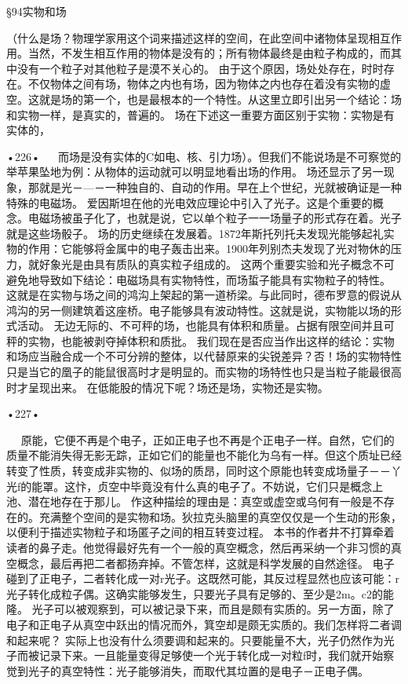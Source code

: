 §94实物和场

（什么是场？物理学家用这个词来描述这样的空间，在此空间中诸物体呈现相互作用。当然，不发生相互作用的物体是没有的；所有物体最终是由粒子构成的，而其中没有一个粒子对其他粒子是漠不关心的。
由于这个原因，场处处存在，时时存在。不仅物体之间有场，物体之内也有场，因为物体之内也存在着没有实物的虚空。这就是场的第一个，也是最根本的一个特性。从这里立即引出另一个结论：场和实物一样，是真实的，普遍的。
场在下述这一重要方面区别于实物：实物是有实体的，

•226•
  
而场是没有实体的C如电、核、引力场）。但我们不能说场是不可察觉的举苹果坠地为例：从物体的运动就可以明显地看出场的作用。
场还显示了另一现象，那就是光－—－一种独自的、自动的作用。早在上个世纪，光就被确证是一种特殊的电磁场。
爱因斯坦在他的光电效应理论中引入了光子。这是个重要的概念。电磁场被虽子化了，也就是说，它以单个粒子一一场量子的形式存在着。光子就是这些场骰子。
场的历史继续在发展着。1872年斯托列托夫发现光能够起礼实物的作用：它能够将金属中的电子轰击出来。1900年列别杰夫发现了光对物休的压力，就好象光是由具有质队的真实粒子组成的。
这两个重要实验和光子概念不可避免地导致如下结论：电磁场具有实物特性，而场蜇子能具有实物粒子的特性。
这就是在实物与场之间的鸿沟上架起的第一道桥梁。与此同时，德布罗意的假说从鸿沟的另一侧建筑着这座桥。电子能够具有波动特性。这就是说，实物能以场的形式活动。
无边无际的、不可秤的场，也能具有体积和质量。占据有限空间并且可秤的实物，也能被剥夺掉体积和质批。
我们现在是否应当作出这样的结论：实物和场应当融合成一个不可分辨的整体，以代替原来的尖锐差异？否！场的实物特性只是当它的凰子的能鼠很高时才是明显的。而实物的场特性也只是当粒子能最很高时才呈现出来。
在低能股的情况下呢？场还是场，实物还是实物。

•227•

  
原能，它便不再是个电子，正如正电子也不再是个正电子一样。自然，它们的质量不能消失得无影无踪，正如它们的能量也不能化为乌有一样。但这个质址已经转变了性质，转变成非实物的、似场的质昂，同时这个原能也转变成场量子－－丫光f的能罩。这忭，贞空中毕竟没有什么真的电子了。不妨说，它们只是概念上池、潜在地存在于那儿。
作这种描绘的理由是：真空或虚空或乌何有一般是不存在的。充满整个空间的是实物和场。狄拉克头脑里的真空仅仅是一个生动的形象，以便利于描述实物粒子和场匿子之间的相互转变过程。
本书的作者井不打算牵着读者的鼻子走。他觉得最好先有一个一般的真空概念，然后再采纳一个非习惯的真空概念，最后再把二者都扬弃掉。不管怎样，这就是科学发展的自然途径。
电子碰到了正电子，二者转化成一对r光子。这既然可能，其反过程显然也应该可能：r光子转化成粒子偶。这确实能够发生，只要光子具有足够的、至少是2m。c2的能隆。
光子可以被观察到，可以被记录下来，而且是颇有实质的。另一方面，除了电子和正电子从真空中跃出的情况而外，箕空却是颇无实质的。我们怎样将二者调和起来呢？
实际上也没有什么须要调和起来的。只要能量不大，光子仍然作为光子而被记录下来。一且能量变得足够使一个光于转化成一对粒f时，我们就开始察觉到光子的真空特性：光子能够消失，而取代其垃置的是电子－正电子偶。

